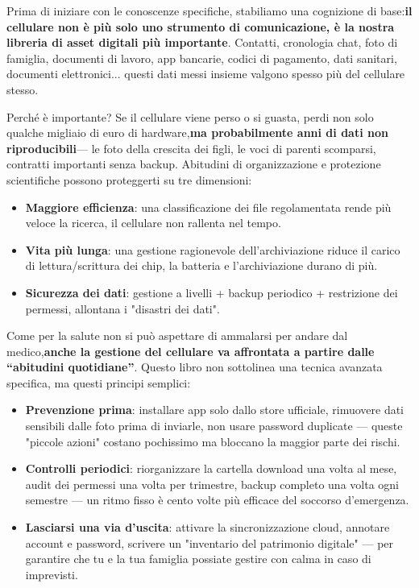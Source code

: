 Prima di iniziare con le conoscenze specifiche, stabiliamo una cognizione di base:\textbf{il cellulare non è più solo uno strumento di comunicazione, è la nostra libreria di asset digitali più importante}. Contatti, cronologia chat, foto di famiglia, documenti di lavoro, app bancarie, codici di pagamento, dati sanitari, documenti elettronici... questi dati messi insieme valgono spesso più del cellulare stesso.

\begin{tcbinfo}{Perché è importante?}
Se il cellulare viene perso o si guasta, perdi non solo qualche migliaio di euro di hardware,\textbf{ma probabilmente anni di dati non riproducibili}— le foto della crescita dei figli, le voci di parenti scomparsi, contratti importanti senza backup. Abitudini di organizzazione e protezione scientifiche possono proteggerti su tre dimensioni:

\begin{itemize}
  \item \textbf{Maggiore efficienza}: una classificazione dei file regolamentata rende più veloce la ricerca, il cellulare non rallenta nel tempo.
  \item \textbf{Vita più lunga}: una gestione ragionevole dell'archiviazione riduce il carico di lettura/scrittura dei chip, la batteria e l'archiviazione durano di più.
  \item \textbf{Sicurezza dei dati}: gestione a livelli + backup periodico + restrizione dei permessi, allontana i "disastri dei dati".
\end{itemize}

\end{tcbinfo}


Come per la salute non si può aspettare di ammalarsi per andare dal medico,\textbf{anche la gestione del cellulare va affrontata a partire dalle “abitudini quotidiane”}. Questo libro non sottolinea una tecnica avanzata specifica, ma questi principi semplici:

\begin{itemize}
  \item \textbf{Prevenzione prima}: installare app solo dallo store ufficiale, rimuovere dati sensibili dalle foto prima di inviarle, non usare password duplicate — queste "piccole azioni" costano pochissimo ma bloccano la maggior parte dei rischi.
  \item \textbf{Controlli periodici}: riorganizzare la cartella download una volta al mese, audit dei permessi una volta per trimestre, backup completo una volta ogni semestre — un ritmo fisso è cento volte più efficace del soccorso d'emergenza.
  \item \textbf{Lasciarsi una via d'uscita}: attivare la sincronizzazione cloud, annotare account e password, scrivere un "inventario del patrimonio digitale" — per garantire che tu e la tua famiglia possiate gestire con calma in caso di imprevisti.
\end{itemize}
